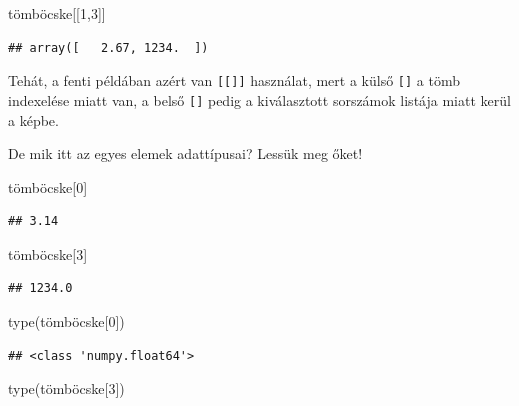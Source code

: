 \documentclass[
]{book}
\newenvironment{Shaded}{\begin{snugshade}}{\end{snugshade}}
\newcommand{\BuiltInTok}[1]{#1}
\newcommand{\DecValTok}[1]{\textcolor[rgb]{0.00,0.00,0.81}{#1}}
\newcommand{\NormalTok}[1]{#1}
\begin{document}
\begin{Shaded}
\begin{Highlighting}[]
\NormalTok{tömböcske[[}\DecValTok{1}\NormalTok{,}\DecValTok{3}\NormalTok{]]}
\end{Highlighting}
\end{Shaded}

\begin{verbatim}
## array([   2.67, 1234.  ])
\end{verbatim}

Tehát, a fenti példában azért van \texttt{{[}{[}{]}{]}} használat, mert a külső \texttt{{[}{]}} a tömb indexelése miatt van, a belső \texttt{{[}{]}} pedig a kiválasztott sorszámok listája miatt kerül a képbe.

De mik itt az egyes elemek adattípusai? Lessük meg őket!

\begin{Shaded}
\begin{Highlighting}[]
\NormalTok{tömböcske[}\DecValTok{0}\NormalTok{]}
\end{Highlighting}
\end{Shaded}

\begin{verbatim}
## 3.14
\end{verbatim}

\begin{Shaded}
\begin{Highlighting}[]
\NormalTok{tömböcske[}\DecValTok{3}\NormalTok{]}
\end{Highlighting}
\end{Shaded}

\begin{verbatim}
## 1234.0
\end{verbatim}

\begin{Shaded}
\begin{Highlighting}[]
\BuiltInTok{type}\NormalTok{(tömböcske[}\DecValTok{0}\NormalTok{])}
\end{Highlighting}
\end{Shaded}

\begin{verbatim}
## <class 'numpy.float64'>
\end{verbatim}

\begin{Shaded}
\begin{Highlighting}[]
\BuiltInTok{type}\NormalTok{(tömböcske[}\DecValTok{3}\NormalTok{])}
\end{Highlighting}
\end{Shaded}
\end{document}

